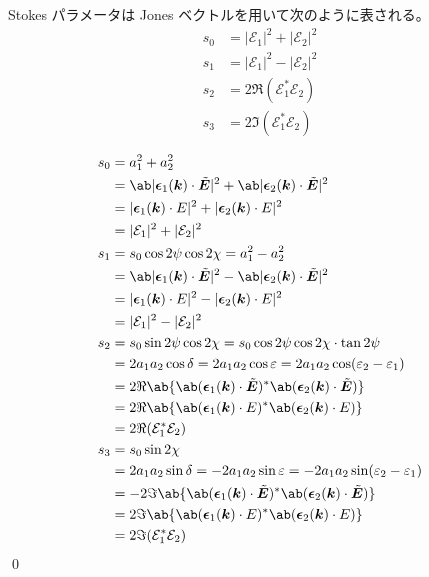 \documentclass[uplatex,dvipdfmx,a4paper,11pt]{jlreq}
\makeatletter
\newcommand{\kk}{\bm{k}}
\newcommand{\ET}{\tilde{\bm{E}}}
\newcommand{\Ec}{\mathcal{E}}
\newcommand{\EC}{\mathcal\bm{E}}
\newcommand{\ee}{\bm{\epsilon}}
\theoremstyle{definition}
\renewenvironment{proof}[1][\proofname]{\par
  \normalfont
  \topsep6\p@\@plus6\p@ \trivlist
  \item[\hskip\labelsep{\bfseries #1}\@addpunct{\bfseries}]\ignorespaces\quad\par
}{%
  \qed\endtrivlist\@endpefalse
}
\renewcommand\proofname{証明}
\makeatother
\begin{document}
\begin{proposition}
  Stokes パラメータは Jones ベクトルを用いて次のように表される。
  \begin{align}
    s_0 & = |\Ec_1|^2 + |\Ec_2|^2 \\
    s_1 & = |\Ec_1|^2 - |\Ec_2|^2 \\
    s_2 & = 2\Re(\Ec_1^*\Ec_2)    \\
    s_3 & = 2\Im(\Ec_1^*\Ec_2)
  \end{align}
\end{proposition}
\begin{proof}
  \begin{align}
    s_0 & = a_1^2 + a_2^2                                                                              \\
        & = \ab|\ee_1(\kk)\cdot\ET|^2 + \ab|\ee_2(\kk)\cdot\ET|^2                                      \\
        & = |\ee_1(\kk)\cdot\EC|^2 + |\ee_2(\kk)\cdot\EC|^2                                            \\
        & = |\Ec_1|^2 + |\Ec_2|^2                                                                      \\
    s_1 & = s_0\cos2\psi\cos2\chi = a_1^2 - a_2^2                                                      \\
        & = \ab|\ee_1(\kk)\cdot\ET|^2 - \ab|\ee_2(\kk)\cdot\ET|^2                                      \\
        & = |\ee_1(\kk)\cdot\EC|^2 - |\ee_2(\kk)\cdot\EC|^2                                            \\
        & = |\Ec_1|^2 - |\Ec_2|^2                                                                      \\
    s_2 & = s_0\sin2\psi\cos2\chi = s_0\cos2\psi\cos2\chi\cdot\tan2\psi                                \\
        & = 2a_1a_2\cos\delta = 2a_1a_2\cos\varepsilon = 2a_1a_2\cos(\varepsilon_2 - \varepsilon_1)    \\
        & = 2\Re\ab\{\ab(\ee_1(\kk)\cdot\ET)^*\ab(\ee_2(\kk)\cdot\ET)\}                                \\
        & = 2\Re\ab\{\ab(\ee_1(\kk)\cdot\EC)^*\ab(\ee_2(\kk)\cdot\EC)\}                                \\
        & = 2\Re(\Ec_1^*\Ec_2)                                                                         \\
    s_3 & = s_0\sin2\chi                                                                               \\
        & = 2a_1a_2\sin\delta = -2a_1a_2\sin\varepsilon = - 2a_1a_2\sin(\varepsilon_2 - \varepsilon_1) \\
        & = - 2\Im\ab\{\ab(\ee_1(\kk)\cdot\ET)^*\ab(\ee_2(\kk)\cdot\ET)\}                              \\
        & = 2\Im\ab\{\ab(\ee_1(\kk)\cdot\EC)^*\ab(\ee_2(\kk)\cdot\EC)\}                                \\
        & = 2\Im(\Ec_1^*\Ec_2)
  \end{align}
\end{proof}
\end{document}
